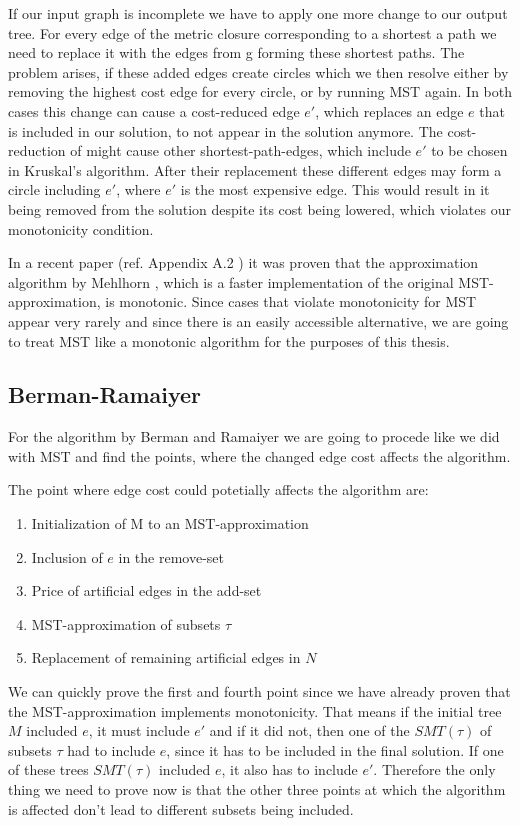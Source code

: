 If our input graph is incomplete we have to apply one more change to our output tree. For every edge of the metric closure corresponding to a shortest a path we need to replace it with the edges from g forming these shortest paths. The problem arises, if these added edges create circles which we then resolve either by removing the highest cost edge for every circle, or by running MST again. In both cases this change can cause a cost-reduced edge $e'$, which replaces an edge $e$ that is included in our solution, to not appear in the solution anymore. The cost-reduction of might cause other shortest-path-edges, which include $e'$ to be chosen in Kruskal's algorithm. After their replacement these different edges may form a circle including $e'$, where $e'$ is the most expensive edge. This would result in it being removed from the solution despite its cost being lowered, which violates our monotonicity condition. 

In a recent paper (ref. Appendix A.2 \cite{bichler2020strategyproof}) it was proven that the approximation algorithm by Mehlhorn \cite{mehlhorn1988faster}, which is a faster implementation of the original MST-approximation, is monotonic. Since cases that violate monotonicity for MST appear very rarely and since there is an easily accessible alternative, we are going to treat MST like a monotonic algorithm for the purposes of this thesis.   

\subsection{Berman-Ramaiyer}

For the algorithm by Berman and Ramaiyer we are going to procede like we did with MST and find the points, where the changed edge cost affects the algorithm.

The point where edge cost could potetially affects the algorithm are:
\begin{enumerate}
\item Initialization of M to an MST-approximation
\item Inclusion of $e$ in the remove-set
\item Price of artificial edges in the add-set
\item MST-approximation of subsets $\tau$
\item Replacement of remaining artificial edges in $N$
\end{enumerate}

We can quickly prove the first and fourth point since we have already proven that the MST-approximation implements monotonicity. That means if the initial tree $M$ included $e$, it must include $e'$ and if it did not, then one of the $SMT(\tau)$ of subsets $\tau$ had to include $e$, since it has to be included in the final solution. If one of these trees $SMT(\tau)$ included $e$, it also has to include $e'$. Therefore the only thing we need to prove now is that the other three points at which the algorithm is affected don't lead to different subsets being included. 

